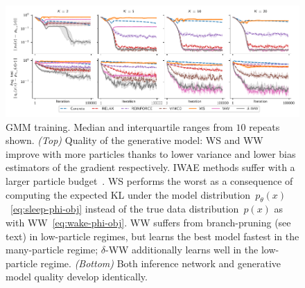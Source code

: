 \begin{figure}[!ht]
  \centering
  \includegraphics[width=\textwidth]{figures/RRWS/gmm/errors_no_std.pdf}
  \vspace*{-4ex}
  \caption{
    \Gls{GMM} training.
    Median and interquartile ranges from $10$ repeats shown.
    \emph{(Top)}
    Quality of the generative model:
    \gls{WS} and \gls{WW} improve with more particles thanks to lower variance and lower bias estimators of the gradient respectively.
    \Gls{IWAE} methods suffer with a larger particle budget~\citep{Rainforth2018tighter}.
    \Gls{WS} performs the worst as a consequence of computing the expected \gls{KL} under the model distribution~\(p_\theta(x)\)~\cref{eq:sleep-phi-obj} instead of the true data distribution~\(p(x)\) as with \gls{WW}~\cref{eq:wake-phi-obj}.
    \Gls{WW} suffers from branch-pruning (see text) in low-particle regimes, but learns the best model fastest in the many-particle regime; $\delta$-\gls{WW} additionally learns well in the low-particle regime.
    \emph{(Bottom)}
    Both inference network and generative model quality develop identically.
  }
  \label{fig:gmm}
  \vspace*{-1ex}
\end{figure}


